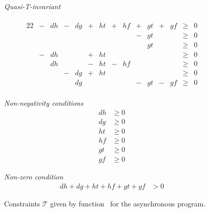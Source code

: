 \begin{figure}
  \begin{minipage}{.79\columnwidth}
    \emph{Quasi-T-invariant} \\ \\[-2em]
    \begin{alignat*}{22}
    &{}-{}& dh &{}-{}& dg &{}+{}& ht &{}+{}& hf &{}+{}& gt &{}+{}& gf &{}\ge{}& 0 \\[-0.1cm]
    &     &    &     &    &     &    &     &    &{}-{}& gt &     &    &{}\ge{}& 0 \\[-0.1cm]
    &     &    &     &    &     &    &     &    &     & gt &     &    &{}\ge{}& 0 \\[-0.1cm]
    &{}-{}& dh &     &    &{}+{}& ht &     &    &     &    &     &    &{}\ge{}& 0 \\[-0.1cm]
    &     & dh &     &    &{}-{}& ht &{}-{}& hf &     &    &     &    &{}\ge{}& 0 \\[-0.1cm]
    &     &    &{}-{}& dg &{}+{}& ht &     &    &     &    &     &    &{}\ge{}& 0 \\[-0.1cm]
    &     &    &     & dg &     &    &     &    &{}-{}& gt &{}-{}& gf &{}\ge{}& 0 \\[-0.1cm]
    \end{alignat*}
  \end{minipage}
  \begin{minipage}{.19\columnwidth}
    \emph{Non-negativity conditions} \\[-2em]
    \begin{align*}
         dh   & \ge 0 \\[-0.1cm]
         dg   & \ge 0 \\[-0.1cm]
         ht   & \ge 0 \\[-0.1cm]
         hf   & \ge 0 \\[-0.1cm]
         gt   & \ge 0 \\[-0.1cm]
         gf   & \ge 0
    \end{align*}
  \end{minipage}
    \emph{Non-zero condition} \\[-2em]
    \begin{align*}
         dh + dg + ht + hf + gt + gf  & > 0
    \end{align*}
  \caption{Constraints $\mathcal{T}$ given by function \liveness\ for
      the asynchronous program.}
\label{fig:setT}
\end{figure}
